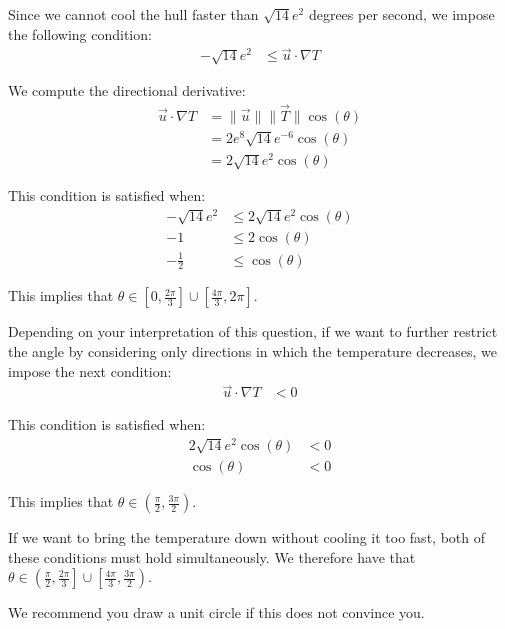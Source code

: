 \begin{solution}
    Since we cannot cool the hull faster than \(\sqrt{14}e^2\) degrees per second, we impose the following condition:
    \begin{align}
        -\sqrt{14}e^2 &\leq \vec{u} \cdot \nabla T
    \end{align}
    
    We compute the directional derivative:
    \begin{align*}
        \vec{u} \cdot \nabla T &= \|\vec{u}\|\|\vec{T}\| \cos(\theta) \\
        &= 2e^8\sqrt{14} e^{-6} \cos(\theta) \\
        &= 2\sqrt{14} e^{2} \cos(\theta)
    \end{align*}
    
    This condition is satisfied when:
    \begin{align*}
        -\sqrt{14}e^2 &\leq 2\sqrt{14} e^{2} \cos(\theta) \\
        -1 &\leq 2 \cos(\theta) \\
        -\frac{1}{2} &\leq \cos(\theta)
    \end{align*}
    
    This implies that \(\theta \in \left[0, \frac{2\pi}{3}\right] \cup \left[\frac{4\pi}{3}, 2\pi\right]\).
    
    Depending on your interpretation of this question, if we want to further restrict the angle by considering only directions in which the temperature decreases, we impose the next condition:
    \begin{align}
        \vec{u} \cdot \nabla T &< 0 
    \end{align}
    
    This condition is satisfied when:
    \begin{align*}
        2\sqrt{14} e^{2} \cos(\theta) &< 0 \\
        \cos(\theta) &< 0
    \end{align*}
    
    This implies that \(\theta \in \left(\frac{\pi}{2}, \frac{3\pi}{2}\right)\).
    
    If we want to bring the temperature down without cooling it too fast, both of these conditions must hold simultaneously. We therefore have that \(\theta \in \left(\frac{\pi}{2}, \frac{2\pi}{3}\right] \cup \left[\frac{4\pi}{3}, \frac{3\pi}{2}\right)\).
    
    We recommend you draw a unit circle if this does not convince you.
\end{solution}

